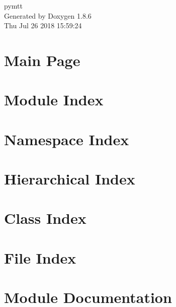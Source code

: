 \documentclass[twoside]{book}
\newcommand{\clearemptydoublepage}{%
  \newpage{\pagestyle{empty}\cleardoublepage}%
}
\begin{document}
\hypersetup{pageanchor=false}
\begin{titlepage}
\vspace*{7cm}
\begin{center}%
{\Large pymtt }\\
\vspace*{1cm}
{\large Generated by Doxygen 1.8.6}\\
\vspace*{0.5cm}
{\small Thu Jul 26 2018 15:59:24}\\
\end{center}
\end{titlepage}
\clearemptydoublepage
\tableofcontents
\clearemptydoublepage
{}
\hypersetup{pageanchor=true}

\chapter{Main Page}
\label{index}\hypertarget{index}{}
\chapter{Module Index}

\chapter{Namespace Index}

\chapter{Hierarchical Index}

\chapter{Class Index}

\chapter{File Index}

\chapter{Module Documentation}






















\end{document}
